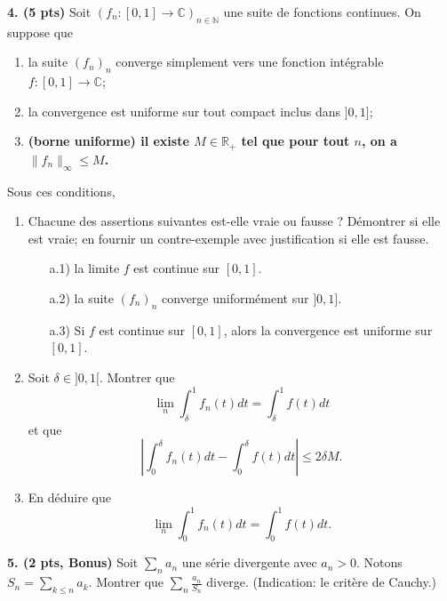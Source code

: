 \documentclass[a4paper,10pt]{article}
\newcommand{\N}{\mathbb{N}}
\newcommand{\R}{\mathbb{R}}
\newcommand{\C}{\mathbb{C}}
\newcommand{\norm}[1]{\|#1\|}
\newcommand{\abs}[1]{\left|#1\right|}
\begin{document}
\vspace{.1in}

\noindent
\textbf{4. (5 pts)}
Soit $(f_n:[0,1]\to\C)_{n\in\N}$ une suite de fonctions continues. On suppose que
\begin{enumerate}[label=\roman*)]
    \item la suite $(f_n)_n$ converge simplement vers une fonction intégrable $f:[0,1]\to\C$;
    \item la convergence est uniforme sur tout compact inclus dans $]0,1]$;
    \item \textbf{(borne uniforme) il existe $M\in\R_+$ tel que pour tout $n$, on a $\norm{f_n}_\infty\leq M$.}
\end{enumerate}
Sous ces conditions,
\begin{enumerate}[label=\alph*)]
    \item Chacune des assertions suivantes est-elle vraie ou fausse ? Démontrer si elle est vraie; en fournir un contre-exemple avec justification si elle est fausse.
    \begin{itemize}
        \item[a.1)] la limite $f$ est continue sur $[0,1]$.
        \item[a.2)] la suite $(f_n)_n$ converge uniformément sur $]0,1]$. 
        \item[a.3)] Si $f$ est continue sur $[0,1]$, alors la convergence est uniforme sur $[0,1]$.
    \end{itemize}
    \item  Soit $\delta\in]0,1[$. Montrer que
    $$\lim_n\int_\delta^1f_n(t)dt=\int_\delta^1f(t)dt$$
    et que
    $$\abs{\int_0^\delta f_n(t)dt-\int_0^\delta f(t)dt}\leq 2\delta M.$$
    \item En déduire que
    $$\lim_n\int_0^1f_n(t)dt=\int_0^1f(t)dt.$$
\end{enumerate}



\vspace{.1in}

\noindent
\textbf{5. (2 pts, Bonus)}
Soit $\sum_n a_n$ une série divergente avec $a_n>0$. Notons $S_n=\sum_{k\leq n}a_k$. Montrer que $\sum_n \frac{a_n}{S_n}$ diverge. (Indication: le critère de Cauchy.)
\end{document}
